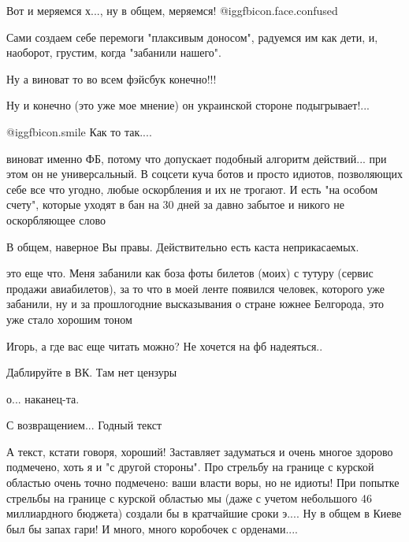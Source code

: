 \begin{itemize}
Вот и меряемся х..., ну в общем, меряемся!  @igg{fbicon.face.confused} 

Сами создаем себе перемоги "плаксивым доносом", радуемся им как дети, и, наоборот, грустим, когда "забанили нашего".

Ну а виноват то во всем фэйсбук конечно!!!

Ну и конечно (это уже мое мнение) он украинской стороне подыгрывает!...

 @igg{fbicon.smile} 
Как то так....

\begin{itemize} %

виноват именно ФБ, потому что допускает подобный алгоритм действий... при этом
он не универсальный. В соцсети куча ботов и просто идиотов, позволяющих себе
все что угодно, любые оскорбления и их не трогают. И есть "на особом счету",
которые уходят в бан на 30 дней за давно забытое и никого не оскорбляющее слово

В общем, наверное Вы правы.
Действительно есть каста неприкасаемых.


это еще что. Меня забанили как боза фоты билетов (моих) с тутуру (сервис
продажи авиабилетов), за то что в моей ленте появился человек, которого уже
забанили, ну и за прошлогодние высказывания о стране южнее Белгорода, это уже
стало хорошим тоном

\end{itemize} %

Игорь, а где вас еще читать можно?
Не хочется на фб надеяться..

\begin{itemize} %
Даблируйте в ВК. Там нет цензуры
\end{itemize} %

о... наканец-та.

С возвращением... Годный текст


А текст, кстати говоря, хороший!  Заставляет задуматься и очень многое здорово
подмечено, хоть я и "с другой стороны".  Про стрельбу на границе с курской
областью очень точно подмечено: ваши власти воры, но не идиоты!  При попытке
стрельбы на границе с курской областью мы (даже с учетом небольшого 46
миллиардного бюджета) создали бы в кратчайшие сроки э....  Ну в общем в Киеве
был бы запах гари!  И много, много коробочек с орденами....


\end{itemize}
